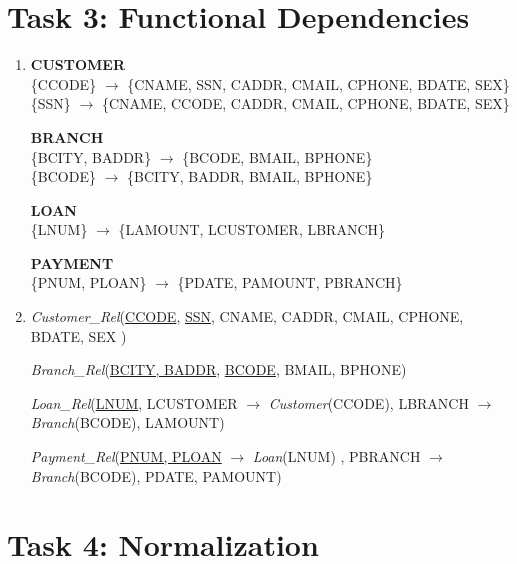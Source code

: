 ﻿\documentclass[12pt,letterpaper]{article}
\begin{document}
\section*{Task 3: Functional Dependencies}
\begin{enumerate}[label={3.\arabic*},nolistsep,leftmargin=*]
\item
    \textbf{CUSTOMER} \\
    \{CCODE\} $\longrightarrow$ \{CNAME, SSN, CADDR, CMAIL, CPHONE, BDATE, SEX\}\\
    \{SSN\} $\longrightarrow$ \{CNAME, CCODE, CADDR, CMAIL, CPHONE, BDATE, SEX\}
    
    \textbf{BRANCH} \\
    \{BCITY, BADDR\} $\longrightarrow$ \{BCODE, BMAIL, BPHONE\}\\
    \{BCODE\} $\longrightarrow$ \{BCITY, BADDR, BMAIL, BPHONE\}
    
    \textbf{LOAN}\\
    \{LNUM\} $\longrightarrow$ \{LAMOUNT, LCUSTOMER, LBRANCH\}
    
    \textbf{PAYMENT}\\
    \{PNUM, PLOAN\} $\longrightarrow$ \{PDATE, PAMOUNT, PBRANCH\}\\

\item
    \textit{Customer\_Rel}(\underline{CCODE}, \underline{SSN}, CNAME, CADDR, CMAIL, CPHONE, BDATE, SEX )
    
    \textit{Branch\_Rel}(\underline{BCITY, BADDR}, \underline{BCODE}, BMAIL, BPHONE)
    
    \textit{Loan\_Rel}(\underline{LNUM}, LCUSTOMER $\longrightarrow$ \textit{Customer}(CCODE), LBRANCH $\longrightarrow$ \textit{Branch}(BCODE), LAMOUNT)
    
    \textit{Payment\_Rel}(\underline{PNUM, PLOAN} $\longrightarrow$ \textit{Loan}(LNUM) , PBRANCH $\longrightarrow$ \textit{Branch}(BCODE), PDATE, PAMOUNT)
    
\end{enumerate}

\section*{Task 4: Normalization}
\end{document}
